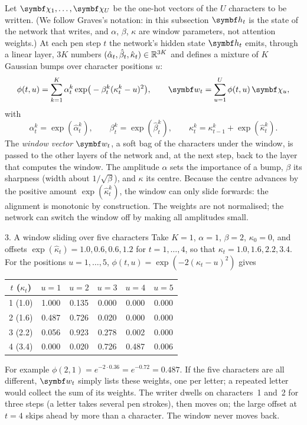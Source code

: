 \documentclass[11pt]{article}
\newcommand{\hv}{\vect{h}}
\begin{document}
Let $\vect{\chi}_1, \dots, \vect{\chi}_U$ be the one-hot vectors of the $U$ characters to be written. (We follow Graves's notation: in this subsection $\hv_t$ is
the state of the network that writes, and $\alpha$, $\beta$, $\kappa$ are window parameters, not attention weights.) At each
pen step $t$ the network's
hidden state $\hv_t$ emits, through a linear layer, $3K$ numbers $(\hat{\alpha}_t, \hat{\beta}_t, \hat{\kappa}_t) \in \mathbb{R}^{3K}$ and
defines a mixture of $K$ Gaussian bumps over character positions $u$:
\begin{equation}\label{eq:window}
  \phi(t, u) = \sum_{k=1}^{K}\alpha_t^k\exp\!\big(-\beta_t^k(\kappa_t^k - u)^2\big), \qquad
  \vect{w}_t = \sum_{u=1}^{U}\phi(t, u)\,\vect{\chi}_u ,
\end{equation}
with
\begin{equation}\label{eq:windowparams}
  \alpha_t^k = \exp(\hat{\alpha}_t^k), \qquad \beta_t^k = \exp(\hat{\beta}_t^k), \qquad
  \kappa_t^k = \kappa_{t-1}^k + \exp(\hat{\kappa}_t^k) .
\end{equation}
The \emph{window vector} $\vect{w}_t$, a soft bag of the characters under the window, is passed to the other layers of the network and, at the next
step, back to the layer that computes the window. The amplitude $\alpha$ sets the importance of a bump, $\beta$ its sharpness (width about $1/\sqrt{\beta}$), and
$\kappa$ its centre. Because the centre advances by the positive amount $\exp(\hat{\kappa}_t^k)$, the window can only slide
forwards: the alignment is monotonic by construction. The weights are not normalised; the network can switch the window off
by making all amplitudes small.

\begin{worked}{3. A window sliding over five characters}
Take $K = 1$, $\alpha = 1$, $\beta = 2$, $\kappa_0 = 0$, and offsets $\exp(\hat{\kappa}_t) = 1.0, 0.6, 0.6, 1.2$ for
$t = 1, \dots, 4$, so that $\kappa_t = 1.0, 1.6, 2.2, 3.4$. For the positions $u = 1, \dots, 5$,
$\phi(t, u) = \exp(-2(\kappa_t - u)^2)$ gives
\begin{center}\small
\begin{tabular}{@{}cccccc@{}}
\toprule
$t$ ($\kappa_t$) & $u = 1$ & $u = 2$ & $u = 3$ & $u = 4$ & $u = 5$ \\
\midrule
1 (1.0) & 1.000 & 0.135 & 0.000 & 0.000 & 0.000 \\
2 (1.6) & 0.487 & 0.726 & 0.020 & 0.000 & 0.000 \\
3 (2.2) & 0.056 & 0.923 & 0.278 & 0.002 & 0.000 \\
4 (3.4) & 0.000 & 0.020 & 0.726 & 0.487 & 0.006 \\
\bottomrule
\end{tabular}
\end{center}
For example $\phi(2, 1) = e^{-2 \cdot 0.36} = e^{-0.72} = 0.487$. If the five characters are all different,
$\vect{w}_t$ simply lists these weights, one per letter; a repeated letter would collect the sum of its weights. The writer dwells on characters~1 and~2 for three steps (a letter takes several pen strokes), then
moves on; the large offset at $t = 4$ skips ahead by more than a character. The window never moves back.
\end{worked}
\end{document}
